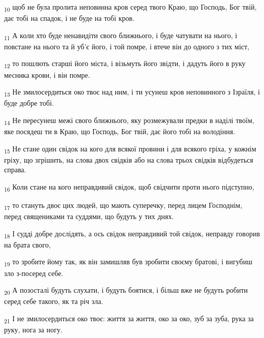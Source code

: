 \begin{tcolorbox}
\textsubscript{10} щоб не була пролита неповинна кров серед твого Краю, що Господь, Бог твій, дає тобі на спадок, і не буде на тобі кров.
\end{tcolorbox}
\begin{tcolorbox}
\textsubscript{11} А коли хто буде ненавидіти свого ближнього, і буде чатувати на нього, і повстане на нього та й уб'є його, і той помре, і втече він до одного з тих міст,
\end{tcolorbox}
\begin{tcolorbox}
\textsubscript{12} то пошлють старші його міста, і візьмуть його звідти, і дадуть його в руку месника крови, і він помре.
\end{tcolorbox}
\begin{tcolorbox}
\textsubscript{13} Не змилосердиться око твоє над ним, і ти усунеш кров неповинного з Ізраїля, і буде добре тобі.
\end{tcolorbox}
\begin{tcolorbox}
\textsubscript{14} Не пересунеш межі свого ближнього, яку розмежували предки в наділі твоїм, яке посядеш ти в Краю, що Господь, Бог твій, дає його тобі на володіння.
\end{tcolorbox}
\begin{tcolorbox}
\textsubscript{15} Не стане один свідок на кого для всякої провини і для всякого гріха, у кожнім гріху, що згрішить, на слова двох свідків або на слова трьох свідків відбудеться справа.
\end{tcolorbox}
\begin{tcolorbox}
\textsubscript{16} Коли стане на кого неправдивий свідок, щоб свідчити проти нього підступно,
\end{tcolorbox}
\begin{tcolorbox}
\textsubscript{17} то стануть двоє цих людей, що мають суперечку, перед лицем Господнім, перед священиками та суддями, що будуть у тих днях.
\end{tcolorbox}
\begin{tcolorbox}
\textsubscript{18} І судді добре дослідять, а ось свідок неправдивий той свідок, неправду говорив на брата свого,
\end{tcolorbox}
\begin{tcolorbox}
\textsubscript{19} то зробите йому так, як він замишляв був зробити своєму братові, і вигубиш зло з-посеред себе.
\end{tcolorbox}
\begin{tcolorbox}
\textsubscript{20} А позосталі будуть слухати, і будуть боятися, і більш вже не будуть робити серед себе такого, як та річ зла.
\end{tcolorbox}
\begin{tcolorbox}
\textsubscript{21} І не змилосердиться око твоє: життя за життя, око за око, зуб за зуба, рука за руку, нога за ногу.
\end{tcolorbox}
